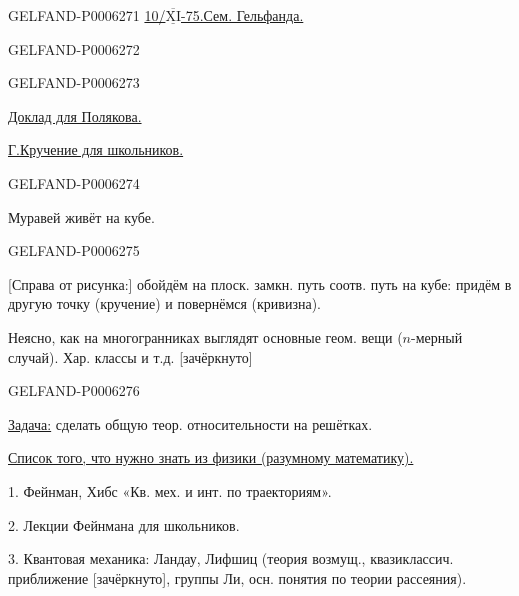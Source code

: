 \begin{GelfandAdjacentEvidence}{GELFAND-P000627}{1}
\underline{10/\(\overline{\underline{\mathrm{XI}}}\)-75.}\qquad\underline{Сем. Гельфанда.}
\end{GelfandAdjacentEvidence}
\begin{GelfandAdjacentEvidence}{GELFAND-P000627}{2}

\end{GelfandAdjacentEvidence}
\begin{GelfandAdjacentEvidence}{GELFAND-P000627}{3}

\underline{Доклад для Полякова.}

\underline{Г.}\quad \underline{Кручение для школьников.}
\end{GelfandAdjacentEvidence}
\begin{GelfandAdjacentEvidence}{GELFAND-P000627}{4}

Муравей живёт на кубе.
\end{GelfandAdjacentEvidence}
\begin{GelfandAdjacentEvidence}{GELFAND-P000627}{5}

[Справа от рисунка:] обойдём на плоск. замкн. путь
соотв. путь на кубе: придём в другую точку (кручение)
и повернёмся (кривизна).

Неясно, как на многогранниках выглядят основные геом. вещи (\(n\)-мерный случай).
Хар. классы и т.д. [зачёркнуто]
\end{GelfandAdjacentEvidence}
\begin{GelfandAdjacentEvidence}{GELFAND-P000627}{6}

\underline{Задача:} сделать общую теор. относительности на решётках.

\underline{Список того, что нужно знать из физики (разумному математику).}

1. Фейнман, Хибс «Кв. мех. и инт. по траекториям».

2. Лекции Фейнмана для школьников.

3. Квантовая механика: Ландау, Лифшиц (теория возмущ., квазиклассич. приближение
[зачёркнуто], группы Ли, осн. понятия по теории рассеяния).
\end{GelfandAdjacentEvidence}
